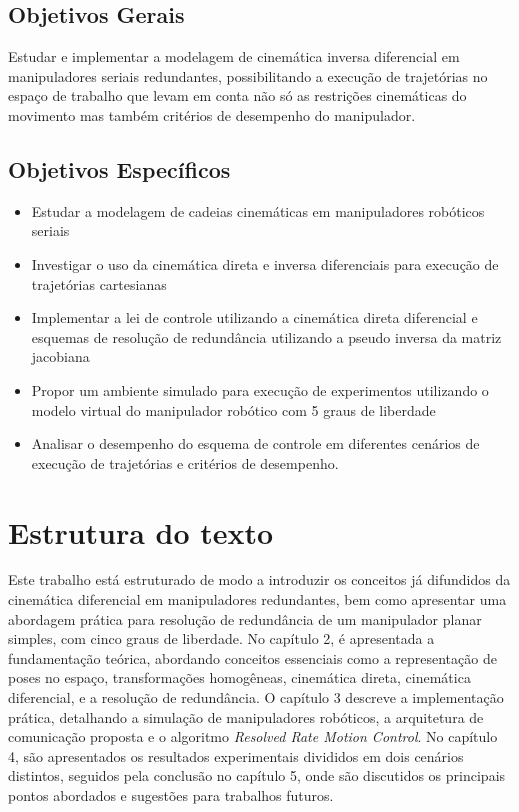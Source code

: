 \subsection{Objetivos Gerais}

Estudar e implementar a modelagem de cinemática inversa diferencial em manipuladores seriais redundantes, possibilitando a execução de
trajetórias no espaço de trabalho que levam em conta não só as restrições cinemáticas do movimento mas também critérios
de desempenho do manipulador.

\subsection{Objetivos Específicos}
\begin{itemize}
	\item Estudar a modelagem de cadeias cinemáticas em manipuladores robóticos seriais
	\item Investigar o uso da cinemática direta e inversa diferenciais para execução de trajetórias cartesianas
	\item Implementar a lei de controle utilizando a cinemática direta diferencial e esquemas de resolução de redundância utilizando a pseudo inversa da matriz jacobiana
	\item Propor um ambiente simulado para execução de experimentos utilizando o modelo virtual do manipulador robótico com 5 graus de liberdade
	\item Analisar o desempenho do esquema de controle em diferentes cenários de execução de trajetórias e critérios de desempenho.
\end{itemize}

\section{Estrutura do texto}\label{sec:structure}

Este trabalho está estruturado de modo a introduzir os conceitos já difundidos da cinemática diferencial em manipuladores redundantes,
bem como apresentar uma abordagem prática para resolução de redundância de um manipulador planar simples, com cinco graus de liberdade.
No capítulo 2, é apresentada a fundamentação teórica, abordando conceitos essenciais como a representação de poses no
espaço, transformações homogêneas, cinemática direta, cinemática diferencial, e a resolução de redundância.
O capítulo 3 descreve a implementação prática, detalhando a simulação de manipuladores robóticos, a arquitetura de comunicação proposta
e o algoritmo \emph{Resolved Rate Motion Control}. No capítulo 4, são apresentados os resultados experimentais divididos em dois cenários
distintos, seguidos pela conclusão no capítulo 5, onde são discutidos os principais pontos abordados e sugestões para trabalhos futuros.
